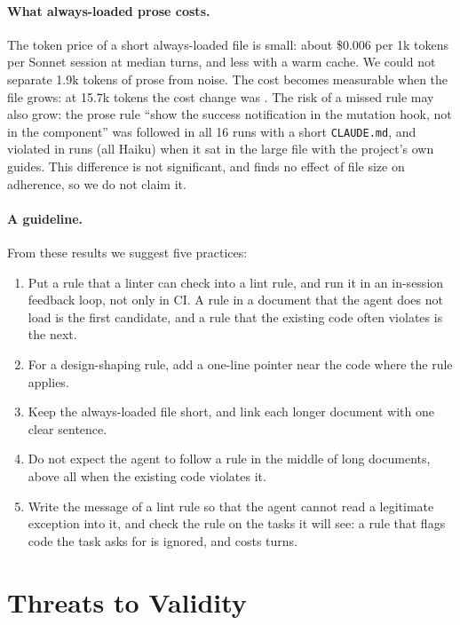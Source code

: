 \documentclass[pdflatex,sn-basic]{sn-jnl}
\newcommand{\file}[1]{\texttt{#1}}
\begin{document}
\paragraph{What always-loaded prose costs.}
The token price of a short always-loaded file is small: about \$0.006 per 1k tokens per Sonnet session at median turns, and less with a warm cache.
We could not separate 1.9k tokens of prose from noise.
The cost becomes measurable when the file grows: at 15.7k tokens the cost change was \HSixCost{}.
The risk of a missed rule may also grow: the prose rule ``show the success notification in the mutation hook, not in the component'' was followed in all 16 runs with a short \file{CLAUDE.md}, and violated in \HFiveBreaks{} runs (all Haiku) when it sat in the large file with the project's own guides.
This difference is not significant, and \citet{mcmillan2026adherence} finds no effect of file size on adherence, so we do not claim it.

\paragraph{A guideline.}
From these results we suggest five practices:
\begin{enumerate}
\item Put a rule that a linter can check into a lint rule, and run it in an in-session feedback loop, not only in CI.
A rule in a document that the agent does not load is the first candidate, and a rule that the existing code often violates is the next.
\item For a design-shaping rule, add a one-line pointer near the code where the rule applies.
\item Keep the always-loaded file short, and link each longer document with one clear sentence.
\item Do not expect the agent to follow a rule in the middle of long documents, above all when the existing code violates it.
\item Write the message of a lint rule so that the agent cannot read a legitimate exception into it, and check the rule on the tasks it will see: a rule that flags code the task asks for is ignored, and costs turns.
\end{enumerate}

\section{Threats to Validity}
\label{sec:threats}
\end{document}

